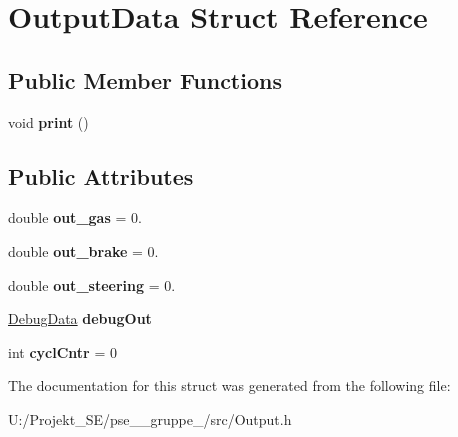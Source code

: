 \hypertarget{struct_output_data}{}\section{Output\+Data Struct Reference}
\label{struct_output_data}
\subsection*{Public Member Functions}
\begin{DoxyCompactItemize}
\item 
\mbox{\label{struct_output_data_a039269e0706328794096b3e5c411aefb}} 
void {\bfseries print} ()
\end{DoxyCompactItemize}
\subsection*{Public Attributes}
\begin{DoxyCompactItemize}
\item 
\mbox{\label{struct_output_data_afc1fa45bfae0c88f8a3e1144140c8449}} 
double {\bfseries out\+\_\+gas} = 0.
\item 
\mbox{\label{struct_output_data_a0f7ff82310ab20b388b510c0d6c9f018}} 
double {\bfseries out\+\_\+brake} = 0.
\item 
\mbox{\label{struct_output_data_aced244ea751ed10711ae440cb4b0c9ee}} 
double {\bfseries out\+\_\+steering} = 0.
\item 
\mbox{\label{struct_output_data_adbb2a12c8c38b8660741295dbc69f7ca}} 
\mbox{\hyperlink{struct_debug_data}{Debug\+Data}} {\bfseries debug\+Out}
\item 
\mbox{\label{struct_output_data_a5c32a2db8f9cb198d261533a920cf0e0}} 
int {\bfseries cycl\+Cntr} = 0
\end{DoxyCompactItemize}


The documentation for this struct was generated from the following file\+:\begin{DoxyCompactItemize}
\item 
U\+:/\+Projekt\+\_\+\+S\+E/pse\+\_\+\_\+gruppe\+\_/src/Output.\+h\end{DoxyCompactItemize}
